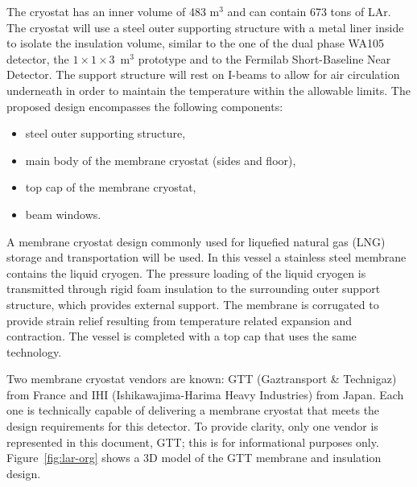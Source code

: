 The cryostat has an inner volume of 483 m$^3$ and can contain  673 tons of LAr.
%
%
The cryostat will use a steel outer supporting structure with a metal liner inside to isolate the insulation volume, similar to the one of the dual phase WA105 detector, the $1\times1\times3$~m$^3$ prototype and to the Fermilab Short-Baseline Near Detector. 
The support structure will rest on I-beams to allow for air circulation underneath in order to maintain the temperature within the allowable limits. The proposed design encompasses the following components:
%
\begin{itemize}
\item steel outer supporting structure,
\item main body of the membrane cryostat (sides and floor), 
\item top cap of the membrane cryostat,
\item beam windows.
\end{itemize}
%
A membrane cryostat design commonly used for liquefied natural gas (LNG) storage and transportation will be used. In this vessel a stainless steel membrane contains the liquid cryogen. The pressure loading of the liquid cryogen is transmitted through rigid foam insulation to the surrounding outer support structure, which provides external support. The membrane is corrugated to provide strain relief resulting from temperature related expansion and contraction. The vessel is completed with a top cap that uses the same technology.

Two membrane cryostat vendors are known: GTT (Gaztransport \& Technigaz) from France and IHI (Ishikawajima-Harima Heavy Industries) from Japan. Each one is technically capable of delivering a membrane cryostat that meets the design requirements for this detector. To provide clarity, only one vendor is represented in this document, GTT; this is for informational purposes only. Figure~\ref{fig:lar-org} shows a 3D model of the GTT membrane and insulation design.

